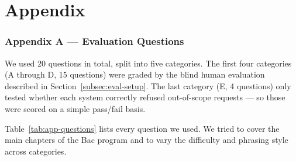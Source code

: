 \chapter{Appendix}
\subsection*{Appendix A — Evaluation Questions}
\label{app:questions}

We used 20 questions in total, split into five categories. The first four
categories (A through D, 15 questions) were graded by the blind human
evaluation described in Section~\ref{subsec:eval-setup}. The last category
(E, 4 questions) only tested whether each system correctly refused
out-of-scope requests — so those were scored on a simple pass/fail basis.

Table~\ref{tab:app-questions} lists every question we used. We tried to
cover the main chapters of the Bac program and to vary the difficulty and
phrasing style across categories.

